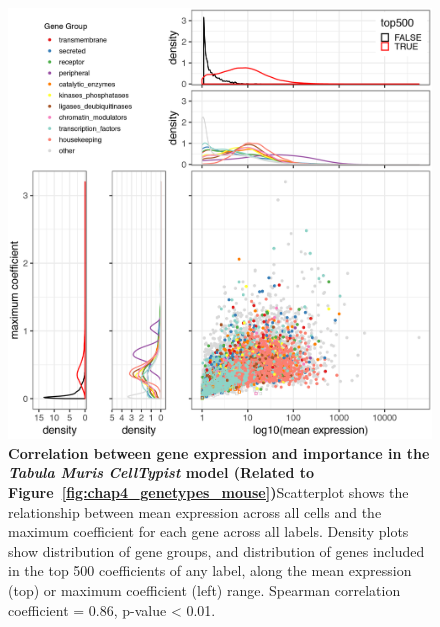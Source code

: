 \begin{figure}[ht!] 
\centering
\includegraphics[scale=0.9]{Appendix3/Figs/gene_coeff_exp_TabulaMuris.png} %
\caption[Correlation between gene expression and importance in the \textit{Tabula Muris} \textit{CellTypist} model]{\textbf{Correlation between gene expression and importance in the \textit{Tabula Muris} \textit{CellTypist} model (Related to Figure~\ref{fig:chap4_genetypes_mouse})}\newline Scatterplot shows the relationship between mean expression across all cells and the maximum coefficient for each gene across all labels. Density plots show distribution of gene groups, and distribution of genes included in the top 500 coefficients of any label, along the mean expression (top) or maximum coefficient (left) range. Spearman correlation coefficient = 0.86, p-value < 0.01.}
\label{fig:appB_mouse_coeff_exp}
\end{figure}


